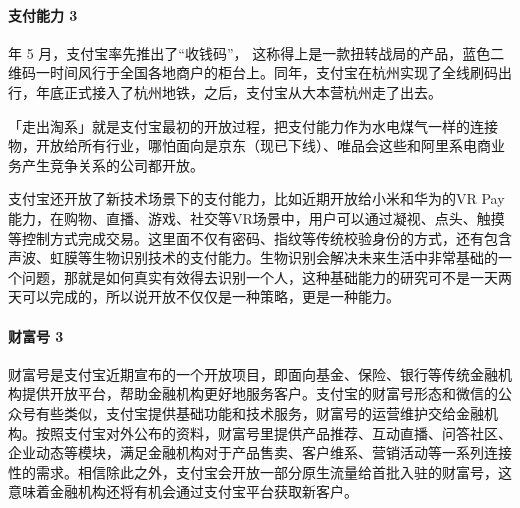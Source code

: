 \documentclass[letterpaper,10pt,english]{sphinxmanual}
\begin{document}
\paragraph{支付能力 3\sphinxfootnotemark[994]}
\label{\detokenize{chapter_AI_company/alipay:id8}}%
\begin{footnotetext}[994]\sphinxAtStartFootnote
{}
%
\end{footnotetext} 年 5 月，支付宝率先推出了“收钱码”，
这称得上是一款扭转战局的产品，蓝色二维码一时间风行于全国各地商户的柜台上。同年，支付宝在杭州实现了全线刷码出行，年底正式接入了杭州地铁，之后，支付宝从大本营杭州走了出去。%
\begin{footnote}[995]\sphinxAtStartFootnote
{}
%
\end{footnote}

「走出淘系」就是支付宝最初的开放过程，把支付能力作为水电煤气一样的连接物，开放给所有行业，哪怕面向是京东（现已下线）、唯品会这些和阿里系电商业务产生竞争关系的公司都开放。

支付宝还开放了新技术场景下的支付能力，比如近期开放给小米和华为的VR
Pay能力，在购物、直播、游戏、社交等VR场景中，用户可以通过凝视、点头、触摸等控制方式完成交易。这里面不仅有密码、指纹等传统校验身份的方式，还有包含声波、虹膜等生物识别技术的支付能力。生物识别会解决未来生活中非常基础的一个问题，那就是如何真实有效得去识别一个人，这种基础能力的研究可不是一天两天可以完成的，所以说开放不仅仅是一种策略，更是一种能力。


\paragraph{财富号 3\sphinxfootnotemark[996]}
\label{\detokenize{chapter_AI_company/alipay:id9}}%
\begin{footnotetext}[996]\sphinxAtStartFootnote
{}
%
\end{footnotetext}\ignorespaces 
财富号是支付宝近期宣布的一个开放项目，即面向基金、保险、银行等传统金融机构提供开放平台，帮助金融机构更好地服务客户。支付宝的财富号形态和微信的公众号有些类似，支付宝提供基础功能和技术服务，财富号的运营维护交给金融机构。按照支付宝对外公布的资料，财富号里提供产品推荐、互动直播、问答社区、企业动态等模块，满足金融机构对于产品售卖、客户维系、营销活动等一系列连接性的需求。相信除此之外，支付宝会开放一部分原生流量给首批入驻的财富号，这意味着金融机构还将有机会通过支付宝平台获取新客户。
\end{document}
